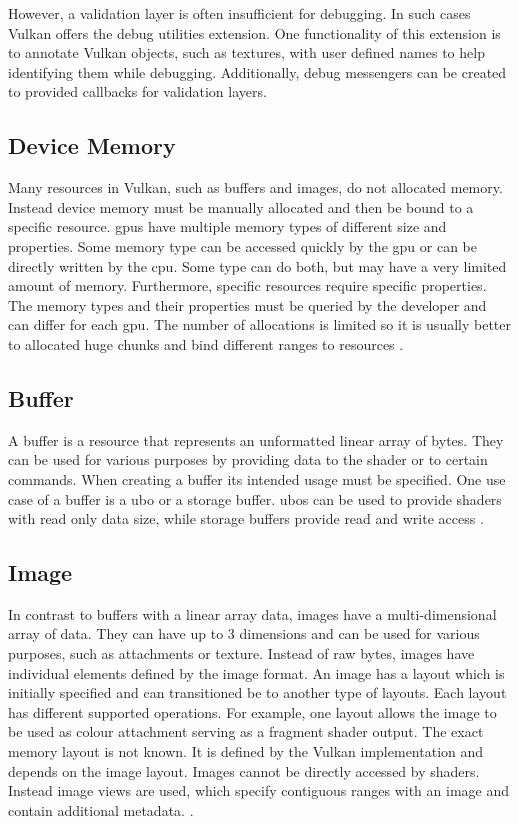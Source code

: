 However, a validation layer is often insufficient for debugging. In such cases Vulkan offers the debug utilities extension. One functionality of this extension is to annotate Vulkan objects, such as textures, with user defined names to help identifying them while debugging. Additionally, debug messengers can be created to provided callbacks for validation layers.
\cite{khronos:vulkan:spec1.1}

\subsection{Device Memory}
Many resources in Vulkan, such as buffers and images, do not allocated memory. Instead device memory must be manually allocated and then be bound to a specific resource. \Glspl{gpu} have multiple memory types of different size and properties. Some memory type can be accessed quickly by the \gls{gpu} or can be directly written by the \gls{cpu}. Some type can do both, but may have a very limited amount of memory. Furthermore, specific resources require specific properties. The memory types and their properties must be queried by the developer and can differ for each \gls{gpu}. The number of allocations is limited so it is usually better to allocated huge chunks and bind different ranges to resources \cite{khronos:vulkan:spec1.1}.

\subsection{Buffer}
\label{section:buffer}
A buffer is a resource that represents an unformatted linear array of bytes. They can be used for various purposes by providing data to the shader or to certain commands. When creating a buffer its intended usage must be specified. One use case of a buffer is a \gls{ubo} or a storage buffer. \Glspl{ubo} can be used to provide shaders with read only data size, while storage buffers provide read and write access \cite{khronos:vulkan:spec1.1}.

\subsection{Image}
In contrast to buffers with a linear array data, images have a multi-dimensional array of data. They can have up to 3 dimensions and can be used for various purposes, such as attachments or texture. Instead of raw bytes, images have individual elements defined by the image format. An image has a layout which is initially specified and can transitioned be to another type of layouts. Each layout has different supported operations.
For example, one layout allows the image to be used as colour attachment serving as a fragment shader output. The exact memory layout is not known. It is defined by the Vulkan implementation and depends on the image layout. 
Images cannot be directly accessed by shaders. Instead image views are used, which specify contiguous ranges with an image and contain additional metadata. \cite{khronos:vulkan:spec1.1}.

